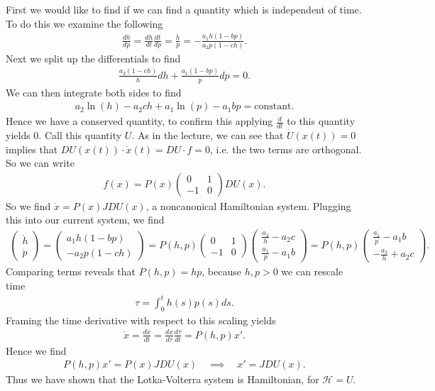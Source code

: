 \begin{solution}[8.7]
First we would like to find if we can find a quantity which is independent of time. To do this we examine the following
\begin{align}
	\frac{dh}{dp} = \frac{dh}{dt} \frac{dt}{dp} = \frac{\dot{h}}{\dot{p}} = - \frac{a_1 h (1-bp)}{a_2 p (1-ch)}.
\end{align}
Next we split up the differentials to find
\begin{align}
	\frac{a_2 (1-ch)}{h}dh + \frac{a_1(1-bp)}{p}dp = 0.
\end{align}
We can then integrate both sides to find
\begin{align}
	a_2 \ln (h) - a_2 ch + a_1 \ln (p) - a_1 bp =  \textrm{constant}. 
\end{align}
Hence we have a conserved quantity, to confirm this applying $\frac{d}{dt}$ to this quantity yields 0. Call this quantity $U$. As in the lecture, we can see that $\dot{U}(x(t))=0$ implies that $D U (x(t)) \cdot \dot{x}(t) = D U \cdot f=0$, i.e. the two terms are orthogonal. So we can write 
\begin{align}
	f(x) = P(x) 
	\begin{pmatrix}
		0 & 1 \\
		-1 & 0
	\end{pmatrix}
	DU(x)	
.\end{align}
So we find $\dot{x} = P(x) JDU(x)$, a noncanonical Hamiltonian system. Plugging this into our current system, we find
\begin{align}
	\begin{pmatrix}
		\dot{h} \\
		\dot{p}
	\end{pmatrix}
	= 
	\begin{pmatrix}
		a_1h(1-bp) \\
		-a_2 p(1-ch)
	\end{pmatrix}
	= P(h,p) 
	\begin{pmatrix}
		0 & 1 \\
		-1 & 0
	\end{pmatrix}
	\begin{pmatrix}
		\frac{a_2 }{h} - a_2 c \\
		\frac{a_1}{p} - a_1 b
	\end{pmatrix}
	=
	P(h,p)
	\begin{pmatrix}
		\frac{a_1}{p} - a_1 b \\
		-\frac{a_2}{h} + a_2 c
	\end{pmatrix}
.\end{align}
Comparing terms reveals that $P(h,p) = hp$, because $h,p>0$ we can rescale time
\begin{align}
	\tau = \int_{0}^{t} h(s)p(s) ds.
\end{align}
Framing the time derivative with respect to this scaling yields
\begin{align}
	\dot{x} = \frac{dx}{dt} = \frac{dx}{d \tau} \frac{d \tau}{dt} = P(h,p) x'.
\end{align}
Hence we find
\begin{align}
	P(h,p) x' = P(x) JDU(x) \quad \implies \quad x' = JDU(x).
\end{align}
Thus we have shown that the Lotka-Volterra system is Hamiltonian, for $\mathcal{H} = U$.


\end{solution}
